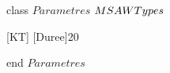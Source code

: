 






\begin{vdm}
{\small\sf class} $Parametres$  \kISO $\index{MSAWTypes|ClassOcc}MSAWTypes$
\begin{valuedef}[KT]{}
[Duree]{20}

\end{valuedef}
{\small\sf end} $Parametres$

\end{vdm}